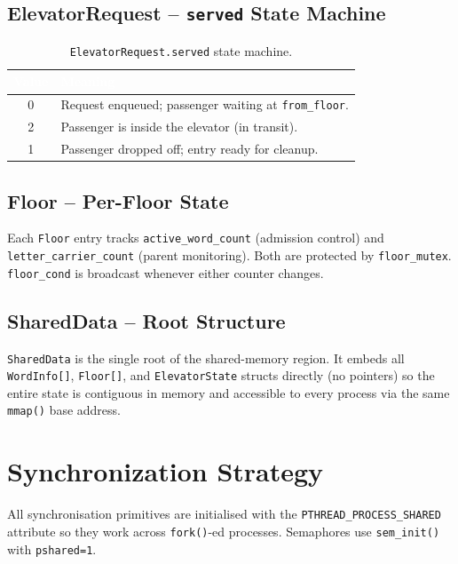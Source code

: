 \documentclass[12pt,a4paper]{article}
\newcommand{\code}[1]{\texttt{\small #1}}
\begin{document}
\subsection{ElevatorRequest -- \texttt{served} State Machine}

\begin{table}[htbp]
\centering
\caption{\texttt{ElevatorRequest.served} state machine.}
\begin{tabular}{cl}
\toprule
\rowcolor{darkblue}
\textcolor{white}{\textbf{Value}} & \textcolor{white}{\textbf{Meaning}} \\
\midrule
0 & Request enqueued; passenger waiting at \texttt{from\_floor}. \\
\rowcolor{rowgray}
2 & Passenger is inside the elevator (in transit). \\
1 & Passenger dropped off; entry ready for cleanup. \\
\bottomrule
\end{tabular}
\end{table}

\subsection{Floor -- Per-Floor State}

Each \code{Floor} entry tracks \code{active\_word\_count} (admission control) and
\code{letter\_carrier\_count} (parent monitoring). Both are protected by
\code{floor\_mutex}. \code{floor\_cond} is broadcast whenever either counter changes.

\subsection{SharedData -- Root Structure}

\code{SharedData} is the single root of the shared-memory region. It embeds all
\code{WordInfo[]}, \code{Floor[]}, and \code{ElevatorState} structs directly (no
pointers) so the entire state is contiguous in memory and accessible to every
process via the same \code{mmap()} base address.

\section{Synchronization Strategy}

All synchronisation primitives are initialised with the
\code{PTHREAD\_PROCESS\_SHARED} attribute so they work across \code{fork()}-ed
processes. Semaphores use \code{sem\_init()} with \code{pshared=1}.
\end{document}
